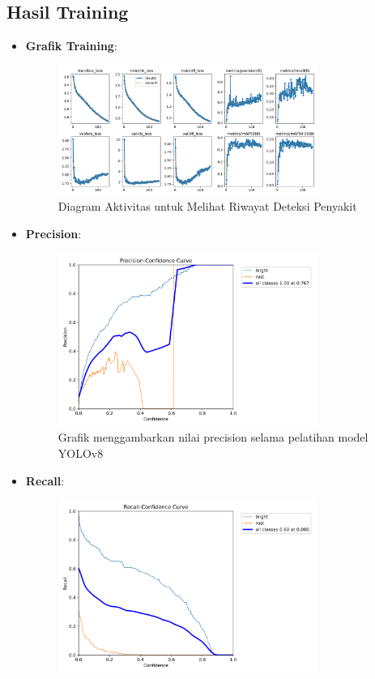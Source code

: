 \documentclass[journal,article,submit,pdftex,moreauthors]{Definitions/mdpi}
\begin{document}
\subsection{Hasil Training}
\begin{itemize}
    \item {\textbf{Grafik Training}}: \\ 
    \begin{figure}[H]
        \centering
        \includegraphics[width=0.8\textwidth]{Images/results.png}
        \caption{\centering Diagram Aktivitas untuk Melihat Riwayat Deteksi Penyakit}
        \label{fig:activity-view-history}
    \end{figure}
    \item {\textbf{Precision}}: \\ 
    \begin{figure}[H]
        \centering
        \includegraphics[width=0.8\textwidth]{Images/P_curve.png}
        \caption{\centering Grafik menggambarkan nilai precision selama pelatihan model YOLOv8}
        \label{fig:activity-view-history}
    \end{figure}
    \item {\textbf{Recall}}: \\ 
    \begin{figure}[H]
        \centering
        \includegraphics[width=0.8\textwidth]{Images/R_curve.png}

\end{figure}
\end{itemize}
\end{document}
